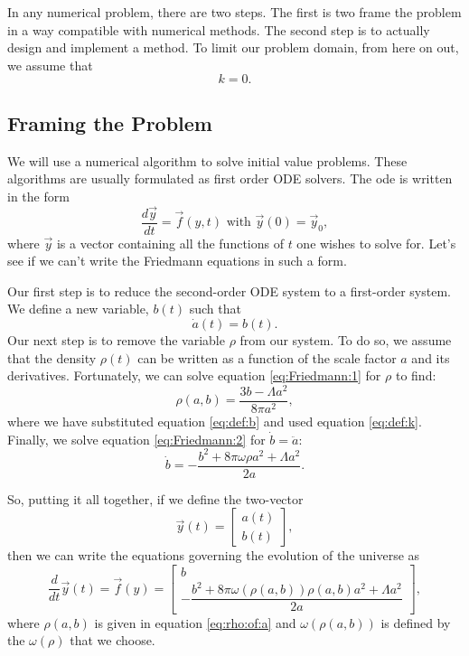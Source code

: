 \documentclass[]{article}
\newcommand{\myvec}[1]{\vec{#1}} %
\newcommand{\diff}[2]{\frac{d #1}{d #2}}
\newcommand{\dd}[1]{\frac{d}{d #1}}
\newcommand{\ddt}{\dd{t}}
\newcommand{\twovector}[2]{\left[\begin{matrix}#1\\#2\end{matrix}\right]}
\begin{document}
In any numerical problem, there are two steps. The first is two frame
the problem in a way compatible with numerical methods. The second
step is to actually design and implement a method. To limit our
problem domain, from here on out, we assume that
\begin{equation}
  \label{eq:def:k}
  k = 0.
\end{equation}

\subsection{Framing the Problem}
\label{subsec:framing:the:problem}

We will use a numerical algorithm to solve initial value
problems. These algorithms are usually formulated as first order ODE
solvers. The ode is written in the form
\begin{equation}
  \label{eq:ode:formulation}
  \diff{\myvec{y}}{t} = \myvec{f}(y,t)\text{ with }\myvec{y}(0) = \myvec{y}_0,
\end{equation}
where $\myvec{y}$ is a vector containing all the functions of $t$ one
wishes to solve for. Let's see if we can't write the Friedmann
equations in such a form. 

Our first step is to reduce the second-order ODE system to a
first-order system. We define a new variable, $b(t)$ such that
\begin{equation}
  \label{eq:def:b}
  \dot{a}(t) = b(t).
\end{equation}
Our next step is to remove the variable $\rho$ from our system. To do
so, we assume that the density $\rho(t)$ can be written as a function
of the scale factor $a$ and its derivatives. Fortunately, we can solve
equation \eqref{eq:Friedmann:1} for $\rho$ \cite{Kempf} to find:
\begin{equation}
  \label{eq:rho:of:a}
  \rho(a,b) = \frac{3 b - \Lambda a^2}{8\pi a^2},
\end{equation}
where we have substituted equation \eqref{eq:def:b} and used equation
\eqref{eq:def:k}. Finally, we solve equation \eqref{eq:Friedmann:2}
for $\dot{b}=\ddot{a}$:
\begin{equation}
  \label{eq:derivative:b}
  \dot{b} = - \frac{b^2 + 8\pi \omega \rho a^2 + \Lambda a^2}{2a}.
\end{equation}

So, putting it all together, if we define the two-vector
\begin{equation}
  \label{eq:def:y}
  \myvec{y}(t) = \twovector{a(t)}{b(t)},
\end{equation}
then we can write the equations governing the evolution of the
universe as
\begin{equation}
  \label{eq:y:prime}
  \ddt \myvec{y}(t) = \myvec{f}(y)
  = \twovector{b}{- \dfrac{b^2 + 8\pi \omega(\rho(a,b)) \rho(a,b) a^2 + \Lambda a^2}{2a}},
\end{equation}
where $\rho(a,b)$ is given in equation \eqref{eq:rho:of:a} and
$\omega(\rho(a,b))$ is defined by the $\omega(\rho)$ that we choose.
\end{document}
